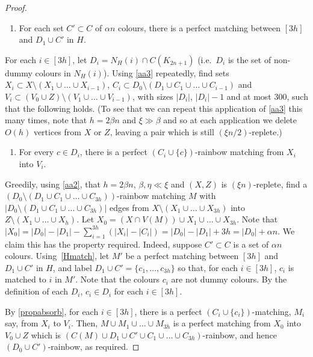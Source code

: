 \begin{proof}
\begin{enumerate}[label = {\bfseries \Alph{propcounter}\arabic{enumi}}]
\addtocounter{enumi}{2}
\item For each set $C'\subset C$ of $\alpha n$ colours, there is a perfect matching between $[3h]$ and $D_1\cup C'$ in $H$.  \label{Hmatch}
\end{enumerate}

For each $i\in [3h]$, let $D_i=N_H(i)\cap C(K_{2n+1})$ (i.e.\ $D_i$ is the set of non-dummy colours in $N_H(i)$). Using \ref{aa3} repeatedly, find sets $X_i\subset X\setminus (X_1\cup\ldots\cup X_{i-1})$,  $C_i\subset D_0\setminus (D_1\cup C_1\cup\ldots\cup C_{i-1})$ and $V_i\subset (V_0\cup Z)\setminus (V_1\cup \ldots\cup V_{i-1})$,
with sizes $|D_i|$, $|D_i|-1$ and at most $300$, such that the following holds. 
(To see that we can repeat this application of \ref{aa3} this many times, note that $h =2\beta n$ and $\xi \gg \beta$ and so at each application we delete $O(h)$ vertices from $X$ or $Z$,  leaving a pair which is still $(\xi n/2)$-replete.)

\begin{enumerate}[label = {\bfseries \Alph{propcounter}\arabic{enumi}}]
\addtocounter{enumi}{3}
\item For every $c\in D_i$, there is a perfect $(C_i\cup\{c\})$-rainbow matching from $X_i$ into $V_i$. %
\label{propabsorb}
\end{enumerate}



Greedily, using \ref{aa2}, that $h=2\beta n$, $\beta,\eta\ll \xi$ and $(X,Z)$ is $(\xi n)$-replete, find a $(D_0\setminus (D_1\cup C_1\cup\ldots\cup C_{3h}))$-rainbow matching $M$ with $|D_0\setminus (D_1\cup C_1\cup \ldots\cup C_{3h})|$ edges from $X\setminus (X_1\cup\ldots\cup X_{3h})$ into $Z\setminus (X_1\cup\ldots\cup X_h)$.
Let $X_0=(X\cap V(M))\cup X_1\cup \ldots\cup X_{3h}$. Note that $|X_0|=|D_0|-|D_1|-\sum_{i=1}^{3h}(|X_i|-|C_i|)=|D_0|-|D_1|+3h=|D_0|+\alpha n$.
We claim this has the property required. Indeed, suppose $C'\subset C$ is a set of $\alpha n$
colours. Using~\ref{Hmatch}, let $M'$ be a perfect matching between $[3h]$ and $D_1\cup C'$ in $H$, and label $D_1\cup C'=\{c_1,\ldots,c_{3h}\}$ so that, for each $i\in [3h]$, $c_i$ is matched to $i$ in $M'$. Note that the colours $c_i$ are not dummy colours.
By the definition of each $D_i$, $c_i\in D_i$ for each $i\in [3h]$.

By \ref{propabsorb}, for each $i\in [3h]$, there is a perfect $(C_i\cup \{c_i\})$-matching, $M_i$ say, from $X_i$ to $V_i$. Then, $M\cup M_1\cup \ldots\cup M_{3h}$ is a perfect matching from $X_0$ into $V_0\cup Z$ which is $(C(M)\cup D_1\cup C'\cup C_1\cup\ldots\cup C_{3h})$-rainbow, and hence $(D_0\cup C')$-rainbow, as required.
\end{proof}



